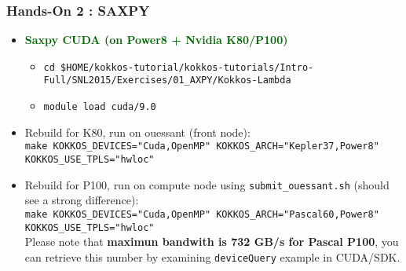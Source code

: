 \begin{frame}[fragile=singleslide]
  \frametitle{Hands-On 2 : SAXPY}

  \begin{itemize}
  \item \textcolor{darkgreen}{\textbf{Saxpy CUDA (on Power8 + Nvidia K80/P100)}}
    \begin{itemize}
    \item \texttt{cd \$HOME/kokkos-tutorial/kokkos-tutorials/Intro-Full/SNL2015/Exercises/01\_AXPY/Kokkos-Lambda}
    \item \texttt{module load cuda/9.0}
    \end{itemize}
  \item Rebuild for K80, run on ouessant (front node):\\
    \texttt{make KOKKOS\_DEVICES="Cuda,OpenMP" KOKKOS\_ARCH="Kepler37,Power8" KOKKOS\_USE\_TPLS="hwloc"}
  \item Rebuild for P100, run on compute node using \texttt{submit\_ouessant.sh} (should see a strong difference):\\
    \texttt{make KOKKOS\_DEVICES="Cuda,OpenMP" KOKKOS\_ARCH="Pascal60,Power8" KOKKOS\_USE\_TPLS="hwloc"}\\
    Please note that \textbf{maximun bandwith is 732 GB/s for Pascal P100}, you can retrieve this number by examining \texttt{deviceQuery} example in CUDA/SDK.
  \end{itemize}
\end{frame}

